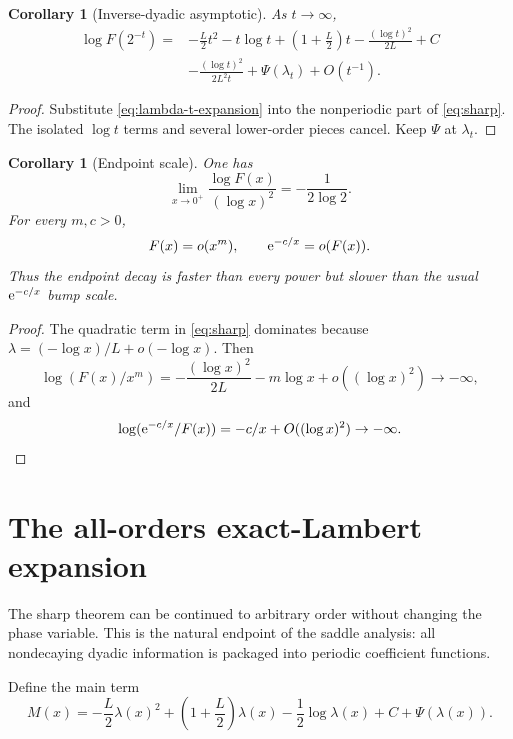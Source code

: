 \documentclass[11pt]{article}
\newtheorem{corollary}[theorem]{Corollary}
\theoremstyle{definition}
\theoremstyle{remark}
\begin{document}
\begin{corollary}[Inverse-dyadic asymptotic]\label{cor:inverse-dyadic}
As $t\to\infty$,
\begin{equation}\label{eq:inverse-dyadic}
\begin{aligned}
 \log F(2^{-t})={}&-\frac L2t^2-t\log t
 +\left(1+\frac L2\right)t
 -\frac{(\log t)^2}{2L}+C\\
 &-\frac{(\log t)^2}{2L^2t}
 +\Psi(\lambda_t)+O(t^{-1}).
\end{aligned}
\end{equation}
\end{corollary}
\begin{proof}
Substitute \eqref{eq:lambda-t-expansion} into the nonperiodic part of \eqref{eq:sharp}.  The isolated $\log t$ terms and several lower-order pieces cancel.  Keep $\Psi$ at $\lambda_t$.
\end{proof}

\begin{corollary}[Endpoint scale]\label{cor:endpoint-scale}
One has
\begin{equation}\label{eq:log-square-limit}
 \lim_{x\to0^+}\frac{\log F(x)}{(\log x)^2}
 =-\frac1{2\log2}.
\end{equation}
For every $m,c>0$,
\begin{equation}\label{eq:decay-comparison}
 F(x)=o(x^m),
 \qquad
 \mathrm e^{-c/x}=o(F(x)).
\end{equation}
Thus the endpoint decay is faster than every power but slower than the usual $\mathrm e^{-c/x}$ bump scale.
\end{corollary}
\begin{proof}
The quadratic term in \eqref{eq:sharp} dominates because $\lambda=(-\log x)/L+o(-\log x)$.  Then
\[
 \log(F(x)/x^m)=-\frac{(\log x)^2}{2L}-m\log x+o((\log x)^2)\to-\infty,
\]
and
\[
 \log(\mathrm e^{-c/x}/F(x))=-c/x+O((\log x)^2)\to-\infty.
\]
\end{proof}

\section{The all-orders exact-Lambert expansion}\label{sec:all-orders}
The sharp theorem can be continued to arbitrary order without changing the phase variable.  This is the natural endpoint of the saddle analysis: all nondecaying dyadic information is packaged into periodic coefficient functions.

Define the main term
\begin{equation}\label{eq:M-main}
 M(x)=-\frac L2\lambda(x)^2+
 \left(1+\frac L2\right)\lambda(x)
 -\frac12\log\lambda(x)+C+\Psi(\lambda(x)).
\end{equation}
\end{document}
